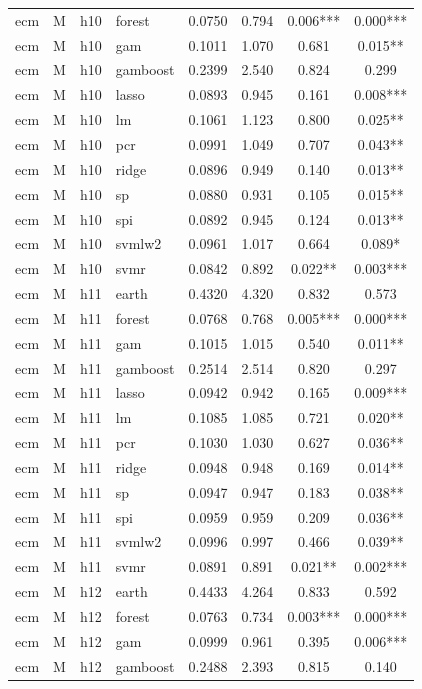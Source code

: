 \begin{ThreePartTable}
\begin{longtable}[t]{llclcccc}
ecm & M & h10 & forest & 0.0750 & 0.794 & 0.006*** & 0.000***\\
ecm & M & h10 & gam & 0.1011 & 1.070 & 0.681 & 0.015**\\
ecm & M & h10 & gamboost & 0.2399 & 2.540 & 0.824 & 0.299\\
ecm & M & h10 & lasso & 0.0893 & 0.945 & 0.161 & 0.008***\\
ecm & M & h10 & lm & 0.1061 & 1.123 & 0.800 & 0.025**\\
ecm & M & h10 & pcr & 0.0991 & 1.049 & 0.707 & 0.043**\\
ecm & M & h10 & ridge & 0.0896 & 0.949 & 0.140 & 0.013**\\
ecm & M & h10 & sp & 0.0880 & 0.931 & 0.105 & 0.015**\\
ecm & M & h10 & spi & 0.0892 & 0.945 & 0.124 & 0.013**\\
ecm & M & h10 & svmlw2 & 0.0961 & 1.017 & 0.664 & 0.089*\\
ecm & M & h10 & svmr & 0.0842 & 0.892 & 0.022** & 0.003***\\
\addlinespace
ecm & M & h11 & earth & 0.4320 & 4.320 & 0.832 & 0.573\\
ecm & M & h11 & forest & 0.0768 & 0.768 & 0.005*** & 0.000***\\
ecm & M & h11 & gam & 0.1015 & 1.015 & 0.540 & 0.011**\\
ecm & M & h11 & gamboost & 0.2514 & 2.514 & 0.820 & 0.297\\
ecm & M & h11 & lasso & 0.0942 & 0.942 & 0.165 & 0.009***\\
ecm & M & h11 & lm & 0.1085 & 1.085 & 0.721 & 0.020**\\
ecm & M & h11 & pcr & 0.1030 & 1.030 & 0.627 & 0.036**\\
ecm & M & h11 & ridge & 0.0948 & 0.948 & 0.169 & 0.014**\\
ecm & M & h11 & sp & 0.0947 & 0.947 & 0.183 & 0.038**\\
ecm & M & h11 & spi & 0.0959 & 0.959 & 0.209 & 0.036**\\
ecm & M & h11 & svmlw2 & 0.0996 & 0.997 & 0.466 & 0.039**\\
ecm & M & h11 & svmr & 0.0891 & 0.891 & 0.021** & 0.002***\\
\addlinespace
ecm & M & h12 & earth & 0.4433 & 4.264 & 0.833 & 0.592\\
ecm & M & h12 & forest & 0.0763 & 0.734 & 0.003*** & 0.000***\\
ecm & M & h12 & gam & 0.0999 & 0.961 & 0.395 & 0.006***\\
ecm & M & h12 & gamboost & 0.2488 & 2.393 & 0.815 & 0.140\\

\end{longtable}
\end{ThreePartTable}
